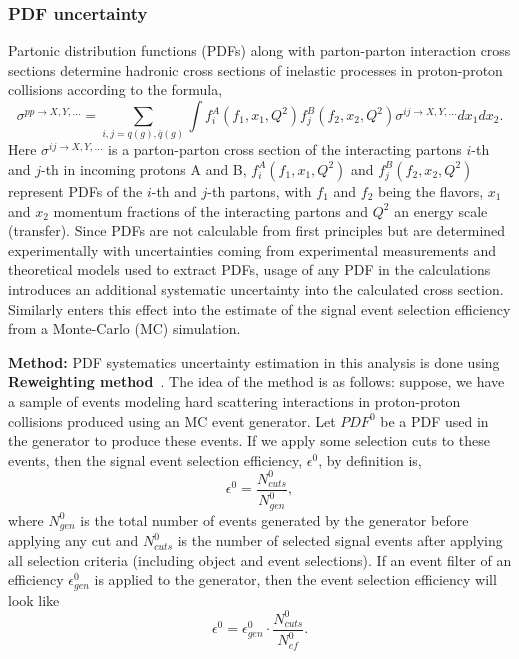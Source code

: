 \subsubsection{PDF uncertainty}
Partonic distribution functions (PDFs) along with parton-parton interaction cross sections 
determine hadronic cross sections of inelastic processes in proton-proton collisions according 
to the formula,
%
\begin{equation}
\sigma^{pp\rightarrow X,Y,...}=\sum_{i,j=q(g),\bar{q}(g)} \int f^A_i(f_1,x_1,Q^2) f^B_j(f_2,x_2,Q^2)\sigma^{i j \rightarrow X,Y,...} dx_1dx_2.
\label{eq:QQbarCX}
\end{equation}
%
Here $\sigma^{i j \rightarrow X,Y,...}$ is a parton-parton cross section of the interacting partons 
$i$-th and $j$-th in incoming protons A and B, $f^A_i(f_1,x_1,Q^2)$ and $ f^B_j(f_2,x_2,Q^2)$ 
represent PDFs of the $i$-th and $j$-th partons, with $f_1$ and $f_2$ being the flavors, $x_1$ and 
$x_2$ momentum fractions of the interacting partons and $Q^2$ an energy scale (transfer). Since PDFs 
are not calculable from first principles but are determined experimentally with uncertainties coming 
from experimental measurements and theoretical models used to extract PDFs, usage of any PDF in the 
calculations introduces an additional systematic uncertainty into the calculated cross section. 
Similarly enters this effect into the estimate of the signal event selection efficiency from a Monte-Carlo 
(MC) simulation.


\vspace{0.4cm}
\noindent
{\bf Method:} 
PDF systematics uncertainty estimation in this analysis is done using {\bf Reweighting method}~\cite{PDF_RW}.
The idea of the method is as follows: suppose, we have a sample of events modeling hard scattering 
interactions in proton-proton collisions produced using an MC event generator. Let $PDF^0$ be a PDF 
used in the generator to produce these events. If we apply some selection cuts to these events, then 
the signal event selection efficiency, $\epsilon^0$, by definition is,
%
\begin{equation}
\epsilon^0 = \frac{N_{cuts}^0}{N_{gen}^0},
\label{eq:eff}
\end{equation}
%
where $N_{gen}^0$ is the total number of events generated by the generator before applying any cut and 
$N_{cuts}^0$ is the number of selected signal events after applying all selection criteria (including 
object and event selections). If an event filter of an efficiency $\epsilon^0_{gen}$ is applied to 
the generator, then the event selection efficiency will look like 
%
\begin{equation}
\label{eq:epsilon}
\epsilon^0 =\epsilon_{gen}^0 \cdot \frac{N_{cuts}^0}{N_{ef}^0}.
\end{equation}
%

